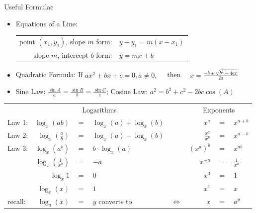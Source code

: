 \begin{center}\Large{Useful Formulae}
\end{center}
\begin{itemize}
	\item Equations of a Line:
\begin{center}\begin{tabular}{rl}
		point $(x_1,y_1)$, slope $m$ form:&$y-y_1 = m(x - x_1)$\\
		slope $m$, intercept $b$ form:&$y=mx+b$
	\end{tabular}\end{center}
	\item Quadratic Formula:
	If $ax^2+bx+c=0$,\,$a\ne0,\quad$ then $\displaystyle\quad x = \frac{-b\pm \sqrt{b^2-4ac}}{2a}$
	\item Sine Law: $\frac{\sin A}{a}= \frac{\sin B}{b}=\frac{\sin C}{c}$; \hspace{0.2cm}Cosine Law: $a^2=b^2+c^2-2bc\cos(A)$
\end{itemize}
\begin{center}
		\renewcommand{\arraystretch}{1.2}
		\begin{tabular}{lrclcrcl}
			\toprule
			&\multicolumn{3}{c}{Logarithms}& &\multicolumn{3}{c}{Exponents}\\
			\cmidrule{1-4}\cmidrule{6-8}
			Law 1: &$ \log_x(ab) $&$=$&$ \log_x(a)+\log_x(b)  $&\hspace{1cm} &$x^a$&$=$&$x^{a+b} $\\
			Law 2: &$ \log_x\left(\frac{a}{b}\right) $&$=$&$  \log_x(a)-\log_x(b) $& &$\frac{x^a}{x^b}$&$=$&$x^{a-b}  $\\
			Law 3: &$ \log_x(a^b) $&$=$&$ b\cdot\log_x(a)   $& &$(x^a)^b $&$=$&$x^{ab} $\\
			\cmidrule{1-4}\cmidrule{6-8}
			&$  \log_{x}\left(\frac{1}{x^a}\right) $&$=$&$-a   $& &$x^{-a} $&$=$&$\frac{1}{x^a} $\\
			&$ \log_{x}1  $&$=$&$ 0  $& &$x^0 $&$=$&$1 $\\
			&$ \log_x(x) $&$=$&$  1 $& &$x^1 $&$=$&$x $\\
			\bottomrule
			recall:&$ \log_a(x) $&$=$&$y$\hspace{0.5cm} converts to& $\Leftrightarrow$ &$x $&$=$&$a^y $\\
			\bottomrule
		\end{tabular}
\end{center}
